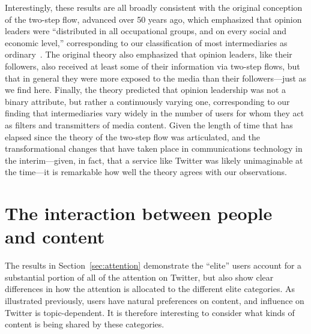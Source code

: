 \documentclass[phd,tocprelim]{cornell}
\renewcommand{\caption}[1]{\singlespacing\hangcaption{#1}\normalspacing}
\begin{document}
Interestingly, these results are all broadly consistent with the original
conception of the two-step flow, advanced over 50 years ago, which
emphasized that opinion leaders were ``distributed in all occupational
groups, and on every social and economic level,'' corresponding to our
classification of most intermediaries as
ordinary~\cite{katz_lazarsfeld}. The original theory also emphasized that
opinion leaders, like their followers, also received at least some of their
information via two-step flows, but that in general they were more exposed
to the media than their followers---just as we find here. Finally, the
theory predicted that opinion leadership was not a binary attribute, but
rather a continuously varying one, corresponding to our finding that
intermediaries vary widely in the number of users for whom they act as
filters and transmitters of media content.  Given the length of time that
has elapsed since the theory of the two-step flow was articulated, and the
transformational changes that have taken place in communications technology
in the interim---given, in fact, that a service like Twitter was likely
unimaginable at the time---it is remarkable how well the theory agrees with
our observations.

\section{The interaction between people and content}
\label{sec:interaction}
The results in Section~\ref{sec:attention} demonstrate the ``elite'' users
account for a substantial portion of all of the attention on Twitter, but
also show clear differences in how the attention is allocated to the
different elite categories. As illustrated previously, users have natural preferences on content, and influence on Twitter is topic-dependent\cite{Leskovec-EC-2006,Cha-2010}. It is therefore interesting to consider what
kinds of content is being shared by these categories. 
\end{document}
